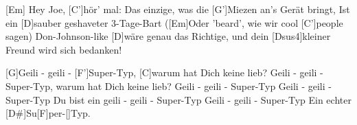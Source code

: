 \begin{guitar}
	[Em] Hey Joe, [C']hör' mal:
	Das einzige, was die [G']Miezen an's Gerät bringt,
	Ist ein [D]sauber geshaveter 3-Tage-Bart
	([Em]Oder 'beard', wie wir cool [C']people sagen)
	Don-Johnson-like [D]wäre genau das Richtige, 
	und dein [Dsus4]kleiner Freund wird sich bedanken!
	
	[G]Geili - geili - [F']Super-Typ, [C]warum hat Dich keine lieb?
	Geili - geili - Super-Typ, warum hat Dich keine lieb?
	Geili - geili - Super-Typ
	Geili - geili - Super-Typ
	Du bist ein geili - geili - Super-Typ
	Geili - geili - Super-Typ
	Ein echter [D#]Su[F]per-[]Typ.
\end{guitar}